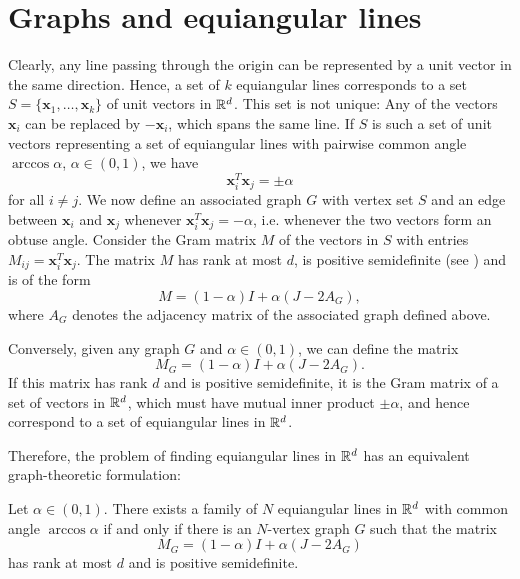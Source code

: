 \section{Graphs and equiangular lines}
Clearly, any line passing through the origin can be represented by a unit vector in the same direction. 
Hence, a set of $k$ equiangular lines corresponds to a set $S = \{ \bm{x}_1, \dots, \bm{x}_k \}$ of unit vectors in $\mathbb{R}^d$. 
This set is not unique: Any of the vectors $\bm{x}_i$ can be replaced by $-\bm{x}_i$, which spans the same line.
If $S$ is such a set of unit vectors representing a set of equiangular lines with pairwise common angle $\arccos \alpha$, $\alpha \in (0, 1)$, we have 
\begin{equation*}
    \bm{x}_i^T \bm{x}_j = \pm \alpha
\end{equation*}
for all $i \ne j$. 
We now define an associated graph $G$ with vertex set $S$ and an edge between $\bm{x}_i$ and $\bm{x}_j$ whenever $\bm{x}_i^T \bm{x}_j = -\alpha$, i.e. whenever the two vectors form an obtuse angle.
Consider the Gram matrix $M$ of the vectors in $S$ with entries $M_{ij} = \bm{x}_i^T \bm{x}_j$.
The matrix $M$ has rank at most $d$, is positive semidefinite (see \cite[Theorem 7.2.10]{matrixanalysis}) and is of the form
\begin{equation*}
    M = (1- \alpha)I + \alpha (J - 2 A_G),
\end{equation*}
where $A_G$ denotes the adjacency matrix of the associated graph defined above.

Conversely, given any graph $G$ and $\alpha \in (0,1)$, we can define the matrix
\begin{equation*}
    M_G = (1- \alpha)I + \alpha (J - 2 A_G).
\end{equation*}
If this matrix has rank $d$ and is positive semidefinite, it is the Gram matrix of a set of vectors in $\mathbb{R}^d$, which must have mutual inner product $\pm \alpha$, and hence correspond to a set of equiangular lines in $\mathbb{R}^d$.

Therefore, the problem of finding equiangular lines in $\mathbb{R}^d$ has an equivalent graph-theoretic formulation:
\begin{lemma} \label{lem:equiangularlines-equivalent-condition}
    Let $\alpha \in (0, 1)$. There exists a family of $N$ equiangular lines in $\mathbb{R}^d$ with common angle $\arccos \alpha$ if and only if there is an $N$-vertex graph $G$ such that the matrix 
    \begin{equation*}
        M_G = (1- \alpha)I + \alpha (J - 2 A_G)
    \end{equation*}
    has rank at most $d$ and is positive semidefinite.
\end{lemma}

